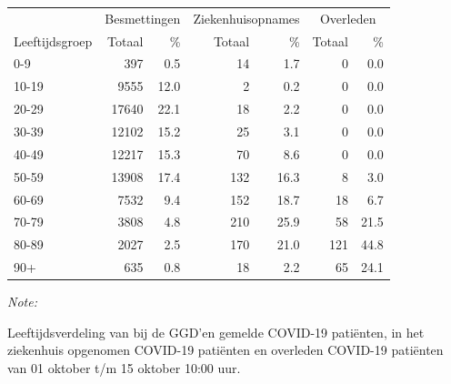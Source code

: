 \documentclass[
  english,
  man,floatsintext]{apa6}
\begin{document}
\begin{table}[H]
\centering\begingroup\fontsize{11}{13}\selectfont

\begin{threeparttable}
\begin{tabular}{lrrrrrr}
\toprule
\multicolumn{1}{c}{ } & \multicolumn{2}{c}{Besmettingen} & \multicolumn{2}{c}{Ziekenhuisopnames} & \multicolumn{2}{c}{Overleden} \\
\cmidrule(l{3pt}r{3pt}){2-3} \cmidrule(l{3pt}r{3pt}){4-5} \cmidrule(l{3pt}r{3pt}){6-7}
Leeftijdsgroep & Totaal & \% & Totaal & \% & Totaal & \%\\
\midrule
0-9 & 397 & 0.5 & 14 & 1.7 & 0 & 0.0\\
10-19 & 9555 & 12.0 & 2 & 0.2 & 0 & 0.0\\
20-29 & 17640 & 22.1 & 18 & 2.2 & 0 & 0.0\\
30-39 & 12102 & 15.2 & 25 & 3.1 & 0 & 0.0\\
40-49 & 12217 & 15.3 & 70 & 8.6 & 0 & 0.0\\
50-59 & 13908 & 17.4 & 132 & 16.3 & 8 & 3.0\\
60-69 & 7532 & 9.4 & 152 & 18.7 & 18 & 6.7\\
70-79 & 3808 & 4.8 & 210 & 25.9 & 58 & 21.5\\
80-89 & 2027 & 2.5 & 170 & 21.0 & 121 & 44.8\\
90+ & 635 & 0.8 & 18 & 2.2 & 65 & 24.1\\
\bottomrule
\end{tabular}
\begin{tablenotes}
\item \textit{Note: } 
\item Leeftijdsverdeling van bij de GGD’en gemelde COVID-19 patiënten, in het ziekenhuis opgenomen COVID-19 patiënten en overleden COVID-19 patiënten van 01 oktober t/m 15 oktober 10:00 uur.
\end{tablenotes}
\end{threeparttable}
\endgroup{}
\end{table}
\end{document}
